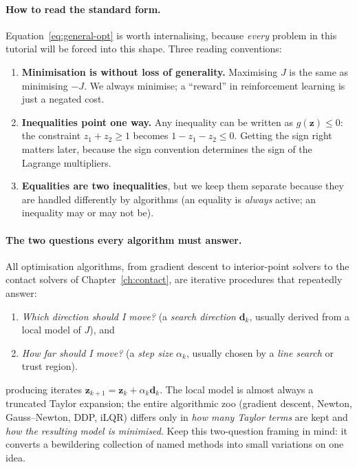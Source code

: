 \documentclass[11pt,twoside]{report}
\theoremstyle{definition}
\theoremstyle{plain}
\theoremstyle{remark}
\newcommand{\0}{\bm{0}}
\begin{document}
\paragraph{How to read the standard form.}
Equation~\eqref{eq:general-opt} is worth internalising, because
\emph{every} problem in this tutorial will be forced into this shape.
Three reading conventions:
\begin{enumerate}
\item \textbf{Minimisation is without loss of generality.}
      Maximising $J$ is the same as minimising $-J$.
      We always minimise; a ``reward'' in reinforcement learning is just
      a negated cost.
\item \textbf{Inequalities point one way.} Any inequality can be written
      as $g(\bm{z})\le 0$: the constraint $z_{1}+z_{2}\ge 1$ becomes
      $1-z_{1}-z_{2}\le 0$. Getting the sign right matters later,
      because the sign convention determines the sign of the
      Lagrange multipliers.
\item \textbf{Equalities are two inequalities}, but we keep them separate
      because they are handled differently by algorithms
      (an equality is \emph{always} active; an inequality may or may not be).
\end{enumerate}

\paragraph{The two questions every algorithm must answer.}
All optimisation algorithms, from gradient descent to interior-point
solvers to the contact solvers of Chapter~\ref{ch:contact},
are iterative procedures that repeatedly answer:
\begin{enumerate}
\item \emph{Which direction should I move?} (a \emph{search direction}
      $\bm{d}_{k}$, usually derived from a local model of $J$), and
\item \emph{How far should I move?} (a \emph{step size} $\alpha_{k}$,
      usually chosen by a \emph{line search} or trust region).
\end{enumerate}
producing iterates $\bm{z}_{k+1}=\bm{z}_{k}+\alpha_{k}\bm{d}_{k}$.
The local model is almost always a truncated Taylor expansion;
the entire algorithmic zoo (gradient descent, Newton, Gauss--Newton,
DDP, iLQR) differs only in \emph{how many Taylor terms} are kept and
\emph{how the resulting model is minimised}.
Keep this two-question framing in mind: it converts a bewildering
collection of named methods into small variations on one idea.
\end{document}
